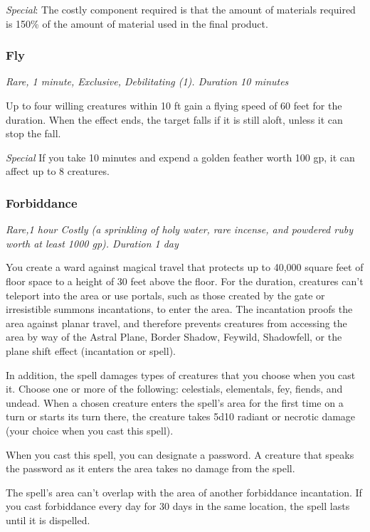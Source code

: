 \textit{Special}: The costly component required is that the amount of materials required is 150\% of the amount of material used in the final product.

\subsubsection{Fly}
\textit{Rare, 1 minute, Exclusive, Debilitating (1). Duration 10 minutes}

Up to four willing creatures within 10 ft gain a flying speed of 60 feet for the duration. When the effect ends, the target falls if it is still aloft, unless it can stop the fall.

\textit{Special} If you take 10 minutes and expend a golden feather worth 100 gp, it can affect up to 8 creatures.

\subsubsection{Forbiddance}
\textit{Rare,1 hour Costly (a sprinkling of holy water, rare incense, and powdered ruby worth at least 1000 gp). Duration 1 day}

You create a ward against magical travel that protects up to 40,000 square feet of floor space to a height of 30 feet above the floor. For the duration, creatures can't teleport into the area or use portals, such as those created by the gate or irresistible summons incantations, to enter the area. The incantation proofs the area against planar travel, and therefore prevents creatures from accessing the area by way of the Astral Plane, Border Shadow, Feywild, Shadowfell, or the plane shift effect (incantation or spell).

In addition, the spell damages types of creatures that you choose when you cast it. Choose one or more of the following: celestials, elementals, fey, fiends, and undead. When a chosen creature enters the spell's area for the first time on a turn or starts its turn there, the creature takes 5d10 radiant or necrotic damage (your choice when you cast this spell).

When you cast this spell, you can designate a password. A creature that speaks the password as it enters the area takes no damage from the spell.

The spell's area can't overlap with the area of another forbiddance incantation. If you cast forbiddance every day for 30 days in the same location, the spell lasts until it is dispelled.

